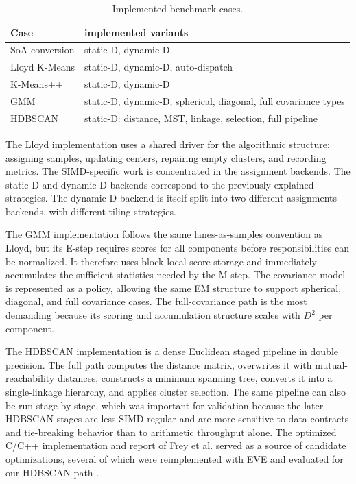 \documentclass[11pt,a4paper]{article}
\begin{document}
\begin{table}[H]
\centering
\begin{tabular}{ll}
\toprule
Case & implemented variants \\
\midrule
SoA conversion & static-D, dynamic-D \\
Lloyd K-Means & static-D, dynamic-D, auto-dispatch \\
K-Means++ & static-D, dynamic-D \\
GMM & static-D, dynamic-D; spherical, diagonal, full covariance types \\
HDBSCAN & static-D: distance, MST, linkage, selection, full pipeline \\
\bottomrule
\end{tabular}
\caption{Implemented benchmark cases.}
\label{tab:implemented-benchmark-space}
\end{table}

The Lloyd implementation uses a shared driver for the algorithmic structure: assigning samples, updating centers, repairing empty clusters, and recording metrics. The SIMD-specific work is concentrated in the assignment backends. The static-D and dynamic-D backends correspond to the previously explained strategies. The dynamic-D backend is itself split into two different assignments backends, with different tiling strategies.

The GMM implementation follows the same lanes-as-samples convention as Lloyd, but its E-step requires scores for all components before responsibilities can be normalized. It therefore uses block-local score storage and immediately accumulates the sufficient statistics needed by the M-step. The covariance model is represented as a policy, allowing the same EM structure to support spherical, diagonal, and full covariance cases. The full-covariance path is the most demanding because its scoring and accumulation structure scales with \(D^2\) per component.

The HDBSCAN implementation is a dense Euclidean staged pipeline in double precision. The full path computes the distance matrix, overwrites it with mutual-reachability distances, constructs a minimum spanning tree, converts it into a single-linkage hierarchy, and applies cluster selection. The same pipeline can also be run stage by stage, which was important for validation because the later HDBSCAN stages are less SIMD-regular and are more sensitive to data contracts and tie-breaking behavior than to arithmetic throughput alone. The optimized C/C++ implementation and report of Frey et al. served as a source of candidate optimizations, several of which were reimplemented with EVE and evaluated for our HDBSCAN path \cite{frey2021hdbscan}.
\end{document}
